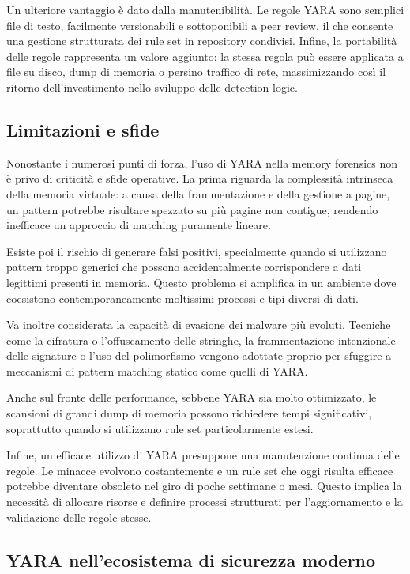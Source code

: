 Un ulteriore vantaggio è dato dalla manutenibilità. Le regole YARA sono semplici file di testo, facilmente versionabili e sottoponibili a peer review, il che consente una gestione strutturata dei rule set in repository condivisi. Infine, la portabilità delle regole rappresenta un valore aggiunto: la stessa regola può essere applicata a file su disco, dump di memoria o persino traffico di rete, massimizzando così il ritorno dell’investimento nello sviluppo delle detection logic.

\subsection{Limitazioni e sfide}

Nonostante i numerosi punti di forza, l’uso di YARA nella memory forensics non è privo di criticità e sfide operative. La prima riguarda la complessità intrinseca della memoria virtuale: a causa della frammentazione e della gestione a pagine, un pattern potrebbe risultare spezzato su più pagine non contigue, rendendo inefficace un approccio di matching puramente lineare.

Esiste poi il rischio di generare falsi positivi, specialmente quando si utilizzano pattern troppo generici che possono accidentalmente corrispondere a dati legittimi presenti in memoria. Questo problema si amplifica in un ambiente dove coesistono contemporaneamente moltissimi processi e tipi diversi di dati.

Va inoltre considerata la capacità di evasione dei malware più evoluti. Tecniche come la cifratura o l’offuscamento delle stringhe, la frammentazione intenzionale delle signature o l’uso del polimorfismo vengono adottate proprio per sfuggire a meccanismi di pattern matching statico come quelli di YARA.

Anche sul fronte delle performance, sebbene YARA sia molto ottimizzato, le scansioni di grandi dump di memoria possono richiedere tempi significativi, soprattutto quando si utilizzano rule set particolarmente estesi.

Infine, un efficace utilizzo di YARA presuppone una manutenzione continua delle regole. Le minacce evolvono costantemente e un rule set che oggi risulta efficace potrebbe diventare obsoleto nel giro di poche settimane o mesi. Questo implica la necessità di allocare risorse e definire processi strutturati per l’aggiornamento e la validazione delle regole stesse.


\subsection{YARA nell'ecosistema di sicurezza moderno}


